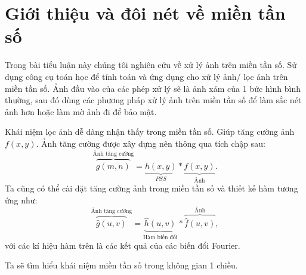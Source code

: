 \documentclass[12pt,a4paper]{report}
\numberwithin{equation}{section}
\theoremstyle{definition} %
\begin{document}
\section{Giới thiệu và đôi nét về miền tần số}
Trong bài tiểu luận này chúng tôi nghiên cứu về xử lý ảnh trên miền tần số. Sử dụng công cụ toán học để tính toán và ứng dụng cho xử lý ảnh/ lọc ảnh trên miền tần số. Ảnh đầu vào của các phép xử lý sẽ là ảnh xám của 1 bức hình bình thường, sau đó dùng các phương pháp xử lý ảnh trên miền tần số để làm sắc nét ảnh hơn hoặc làm mờ ảnh đi để 
bảo mật. 

Khái niệm lọc ảnh dễ dàng nhận thấy trong miền tần số. Giúp tăng cường ảnh $f(x,y)$. Ảnh tăng cường được xây dựng nên thông qua tích chập sau: 
\[\overbrace{g(m,n)}^{\text{Ảnh tăng cường}} = \underbrace{h(x,y)}_{PSS}\ast\underbrace{f(x,y)}_{\text{Ảnh}}.\]
Ta cũng có thể cài đặt tăng cường ảnh trong miền tần số và thiết kế hàm tương ứng như: 
\[\overbrace{\hat{g}(u,v)}^{\text{Ảnh tăng cường}} = \underbrace{\hat{h}(u,v)}_{\text{Hàm biến đổi}} \ast \overbrace{\hat{f}(u,v)}^{\text{Ảnh}},\]
với các kí hiệu hàm trên là các kết quả của các biến đổi Fourier.

Ta sẽ tìm hiểu khái niệm miền tần số trong không gian 1 chiều.
\end{document}
